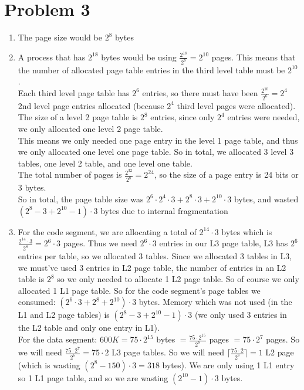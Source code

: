 \documentclass{article}
\begin{document}
\section*{Problem 3}
\begin{enumerate}[label=\alph*)]
\item The page size would be $2^8$ bytes\\
\item A process that has $2^{18}$ bytes would be using $\frac{2^{18}}{2^8} = 2^{10}$ pages. This means that the number of allocated page table entries in the third level table must be $2^{10}$. \\Each third level page table has $2^6$ entries, so there must have been $\frac{2^{10}}{2^6} = 2^4$ 2nd level page entries allocated (because $2^4$ third level pages were allocated).\\ The size of a level 2 page table is $2^8$ entries, since only $2^4$ entries were needed, we only allocated one level 2 page table.\\ This means we only needed one page entry in the level 1 page table, and thus we only allocated one level one page table. So in total, we allocated 3 level 3 tables, one level 2 table, and one level one table. \\The total number of pages is $\frac{2^{32}}{2^8} = 2^{24}$, so the size of a page entry is 24 bits or 3 bytes. \\
So in total, the page table size was $2^6 \cdot 2^4 \cdot 3 + 2^8\cdot 3 + 2^{10} \cdot 3$ bytes, and wasted $(2^8 - 3 + 2^{10} - 1) \cdot 3$ bytes due to internal fragmentation\\ 
\item For the code segment, we are allocating a total of $2^{14} \cdot 3$ bytes which is $\frac{2^{14} \cdot 3 }{2^8} = 2^6 \cdot 3$ pages. Thus we need $2^6 \cdot 3$ entries in our L3 page table, L3 has $2^6$ entries per table, so we allocated 3 tables. Since we allocated 3 tables in L3, we must've used 3 entries in L2 page table, the number of entries in an L2 table is $2^8$ so we only needed to allocate 1 L2 page table. So of course we only allocated 1 L1 page table. So for the code segment's page tables we consumed: $(2^6\cdot 3 + 2^8 + 2^10) \cdot 3$ bytes. Memory which was not used (in the L1 and L2 page tables) is $(2^8 - 3 + 2^{10} - 1) \cdot3 $ (we only used 3 entries in the L2 table and only one entry in L1). \\
For the data segment: $600K = 75 \cdot 2^{15}$ bytes $= \frac{75 \cdot 2^{15}}{2^8}$ pages $= 75 \cdot 2^7$ pages. So we will need $\frac{75 \cdot 2^7}{2^6} = 75 \cdot 2$ L3 page tables. So we will need $\lceil \frac{75 \cdot 2}{2^8} \rceil = 1$ L2 page (which is wasting $(2^8 - 150) \cdot 3 = 318$ bytes). We are only using 1 L1 entry so 1 L1 page table, and so we are wasting $(2^{10} -1) \cdot 3$ bytes. \\

\end{enumerate}
\end{document}
